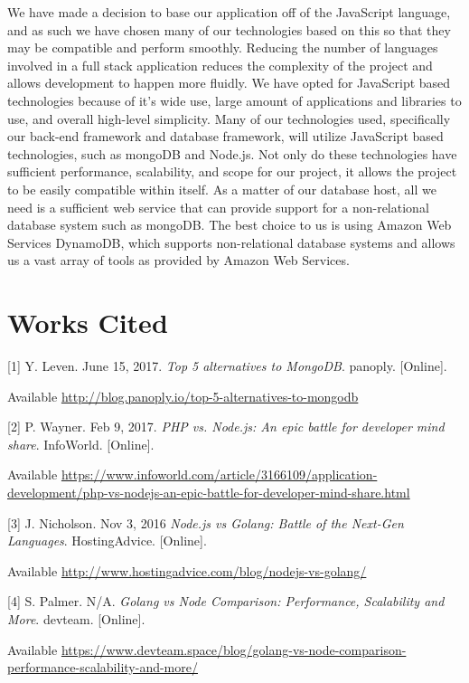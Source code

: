 \documentclass[onecolumn, draftclsnofoot,10pt, compsoc]{IEEEtran}
\begin{document}
	We have made a decision to base our application off of the JavaScript language, and as such we have chosen many of our technologies based on this
	so that they may be compatible and perform smoothly. Reducing the number of languages involved in a full stack application reduces the complexity of
	the project and allows development to happen more fluidly. We have opted for JavaScript based technologies because of it's wide use, large amount of
	applications and libraries to use, and overall high-level simplicity. Many of our technologies used, specifically our back-end framework and database framework, 
	will utilize JavaScript based technologies, such as mongoDB and Node.js. Not only do these technologies have sufficient performance, scalability, and scope for our project, it allows the 
	project to be easily compatible within itself. As a matter of our database host, all we need is a sufficient web service that can provide support for a 
	non-relational database system such as mongoDB. The best choice to us is using Amazon Web Services DynamoDB, which supports non-relational database systems 
	and allows us a vast array of tools as provided by Amazon Web Services. 


	
\section{Works Cited}

[1] Y. Leven. June 15, 2017. \textit{Top 5 alternatives to MongoDB}. panoply. [Online].

Available \url{http://blog.panoply.io/top-5-alternatives-to-mongodb}


[2] P. Wayner. Feb 9, 2017. \textit{PHP vs. Node.js: An epic battle for developer mind share}. InfoWorld. [Online].

Available \url{https://www.infoworld.com/article/3166109/application-development/php-vs-nodejs-an-epic-battle-for-developer-mind-share.html}


[3] J. Nicholson. Nov 3, 2016 \textit{Node.js vs Golang: Battle of the Next-Gen Languages}. HostingAdvice. [Online]. 

Available \url{http://www.hostingadvice.com/blog/nodejs-vs-golang/}


[4]	S. Palmer. N/A. \textit{Golang vs Node Comparison: Performance, Scalability and More}. devteam. [Online]. 

Available \url{https://www.devteam.space/blog/golang-vs-node-comparison-performance-scalability-and-more/}
\end{document}
